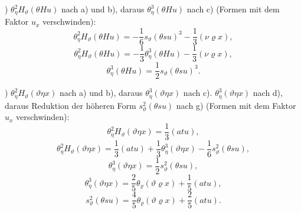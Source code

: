 \documentclass[11pt]{article}
\newcommand{\R}{\varrho}
\begin{document}
) $\theta_\eta^2H_\vartheta(\theta Hu)$ nach a) und b), daraus $\theta_\eta^3(\theta Hu)$ nach c) (Formen mit dem Faktor $u_x$ verschwinden):
\[
\theta_\eta^2H_\vartheta(\theta Hu)=-\frac16s_\vartheta(\theta su)^3-\frac13(\nu\R x),
\]
\[
\theta_\eta^2H_\vartheta(\theta Hu)=-\frac13\theta_\eta^3(\theta Hu)-\frac13(\nu\R x),
\]
\[
\theta_\eta^3(\theta Hu)=\frac12s_\vartheta(\theta su)^3.
\]

) $\theta_\eta^2H_\vartheta(\vartheta\eta x)$ nach a) und b), daraus $\theta_\eta^3(\vartheta\eta x)$ nach c). $\theta_\eta^3(\vartheta\eta x)$ nach d), daraus Reduktion der höheren Form $s_\vartheta^2(\theta su)$ nach g) (Formen mit dem Faktor $u_x$ verschwinden):
\[
\theta_\eta^2H_\vartheta(\vartheta\eta x)=\frac13(atu),
\]
\[
\theta_\eta^2H_\vartheta(\vartheta\eta x)=\frac13(atu)+\frac13\theta_\eta^3(\vartheta\eta x)-\frac16s_\vartheta^2(\theta su),
\]
\[
\theta_\eta^3(\vartheta\eta x)=\frac12s_\vartheta^2(\theta su),
\]
\[
\theta_\eta^3(\vartheta\eta x)=\frac25\theta_\R(\vartheta\R x)+\frac15(atu),
\]
\[
\tag{14}
s_\vartheta^2(\theta su)=\frac45\theta_\R(\vartheta\R x)+\frac25(atu).
\]
\end{document}
